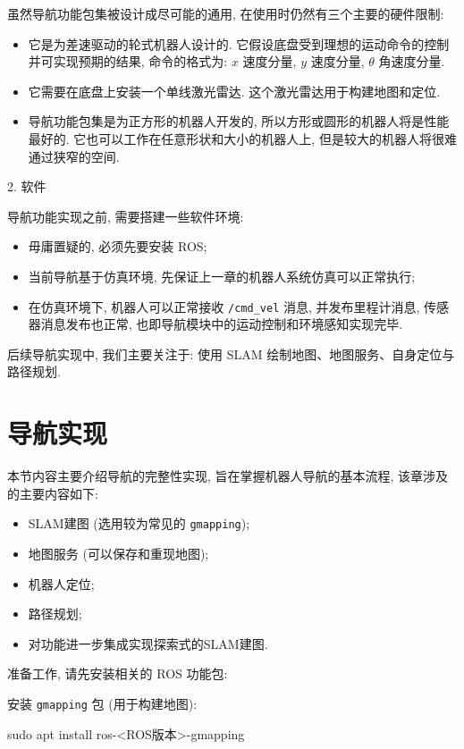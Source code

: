 \documentclass[openany, fontset=windowsold]{ctexbook}
\theoremstyle{kaiti}
\theoremstyle{normal}
\begin{document}
虽然导航功能包集被设计成尽可能的通用, 在使用时仍然有三个主要的硬件限制: 

\begin{itemize}
  \item 它是为差速驱动的轮式机器人设计的. 它假设底盘受到理想的运动命令的控制并可实现预期的结果, 命令的格式为: $x$ 速度分量, $y$ 速度分量, $\theta$ 角速度分量.
  \item 它需要在底盘上安装一个单线激光雷达. 这个激光雷达用于构建地图和定位.
  \item 导航功能包集是为正方形的机器人开发的, 所以方形或圆形的机器人将是性能最好的.  它也可以工作在任意形状和大小的机器人上, 但是较大的机器人将很难通过狭窄的空间.
\end{itemize}

2. 软件

导航功能实现之前, 需要搭建一些软件环境:

\begin{itemize}
  \item 毋庸置疑的, 必须先要安装 ROS;
  \item 当前导航基于仿真环境, 先保证上一章的机器人系统仿真可以正常执行;
  \item 在仿真环境下, 机器人可以正常接收 \verb|/cmd_vel| 消息, 并发布里程计消息, 传感器消息发布也正常, 也即导航模块中的运动控制和环境感知实现完毕.
\end{itemize}

后续导航实现中, 我们主要关注于: 使用 SLAM 绘制地图、地图服务、自身定位与路径规划.

\section{导航实现}

本节内容主要介绍导航的完整性实现, 旨在掌握机器人导航的基本流程, 该章涉及的主要内容如下:

\begin{itemize}
  \item SLAM建图 (选用较为常见的 \verb|gmapping|);
  \item 地图服务 (可以保存和重现地图);
  \item 机器人定位;
  \item 路径规划;
  \item 对功能进一步集成实现探索式的SLAM建图.
\end{itemize}

准备工作, 请先安装相关的 ROS 功能包:

安装 \verb|gmapping| 包 (用于构建地图):

\begin{bash}
  sudo apt install ros-<ROS版本>-gmapping
\end{bash}
\end{document}
